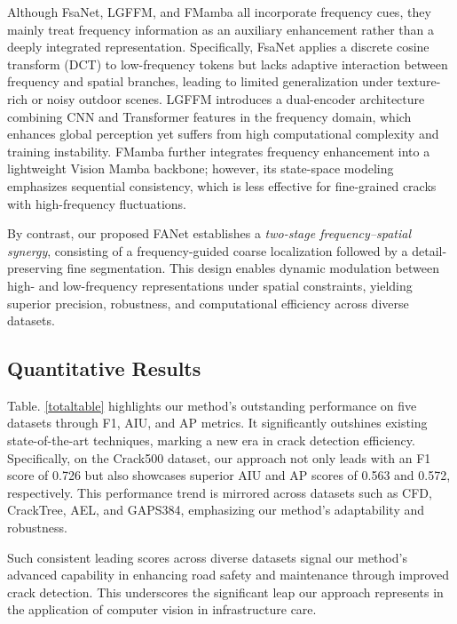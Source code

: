\documentclass[journal]{IEEEtran}
\begin{document}
Although FsaNet, LGFFM, and FMamba all incorporate frequency cues, they mainly treat frequency information as an auxiliary enhancement rather than a deeply integrated representation. 
Specifically, FsaNet applies a discrete cosine transform (DCT) to low-frequency tokens but lacks adaptive interaction between frequency and spatial branches, leading to limited generalization under texture-rich or noisy outdoor scenes. 
LGFFM introduces a dual-encoder architecture combining CNN and Transformer features in the frequency domain, which enhances global perception yet suffers from high computational complexity and training instability. 
FMamba further integrates frequency enhancement into a lightweight Vision Mamba backbone; however, its state-space modeling emphasizes sequential consistency, which is less effective for fine-grained cracks with high-frequency fluctuations.



By contrast, our proposed FANet establishes a \emph{two-stage frequency–spatial synergy}, consisting of a frequency-guided coarse localization followed by a detail-preserving fine segmentation. 
This design enables dynamic modulation between high- and low-frequency representations under spatial constraints, yielding superior precision, robustness, and computational efficiency across diverse datasets.



%
%



\subsection{Quantitative Results}

Table. \ref{totaltable} highlights our method's outstanding performance on five datasets through F1, AIU, and AP metrics. It significantly outshines existing state-of-the-art techniques, marking a new era in crack detection efficiency. Specifically, on the Crack500 dataset, our approach not only leads with an F1 score of 0.726 but also showcases superior AIU and AP scores of 0.563 and 0.572, respectively. This performance trend is mirrored across datasets such as CFD, CrackTree, AEL, and GAPS384, emphasizing our method's adaptability and robustness.

Such consistent leading scores across diverse datasets signal our method's advanced capability in enhancing road safety and maintenance through improved crack detection. This underscores the significant leap our approach represents in the application of computer vision in infrastructure care.
\end{document}
